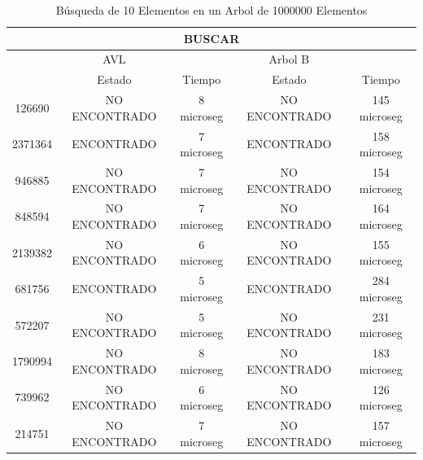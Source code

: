 \documentclass[acmsmall]{acmart}
\begin{document}
\begin{table}[H]
\begin{center}
  \caption{Búsqueda de 10 Elementos en un Arbol de 1000000 Elementos}
  \begin{tabular}{ccccc}
    \toprule
    \multicolumn{5}{c}{BUSCAR}\\
    \midrule
     \, & AVL &\, & Arbol B & \,\\
     \, &Estado&Tiempo&Estado&Tiempo \\
  126690&NO ENCONTRADO&8 microseg&NO ENCONTRADO&145 microseg\\ 
  2371364&ENCONTRADO&7 microseg&ENCONTRADO&158 microseg\\
  946885&NO ENCONTRADO&7 microseg&NO ENCONTRADO&154 microseg\\
  848594&NO ENCONTRADO&7 microseg &NO ENCONTRADO&164 microseg\\ 
  2139382&NO ENCONTRADO&6 microseg&NO ENCONTRADO&155 microseg\\
  681756&ENCONTRADO&5 microseg&ENCONTRADO&284 microseg\\
  572207&NO ENCONTRADO&5 microseg&NO ENCONTRADO&231 microseg\\
  1790994&NO ENCONTRADO&8 microseg &NO ENCONTRADO&183 microseg\\
  739962&NO ENCONTRADO&6 microseg&NO ENCONTRADO&126 microseg\\
  214751&NO ENCONTRADO&7 microseg&NO ENCONTRADO&157 microseg\\

    \bottomrule
  \end{tabular}
  \end{center}
\end{table}
\end{document}
